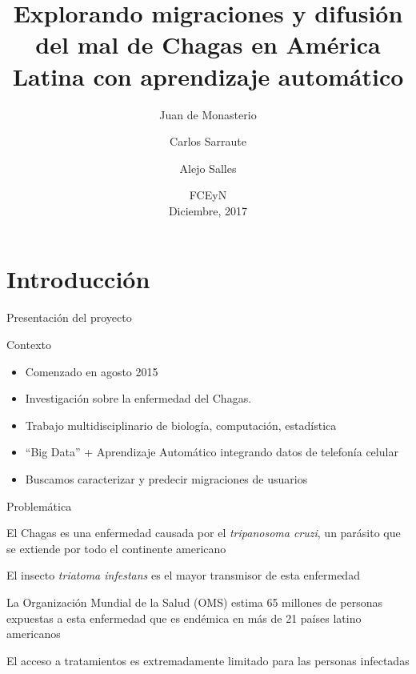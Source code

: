 \documentclass[xcolor=x11names]{beamer}
\title[Chagas \& Big Data]{Explorando migraciones y difusi\'on del mal de Chagas en América Latina con aprendizaje automático}
\author[Sarraute,Salles,de Monasterio]{Juan de Monasterio\inst{1}
  \and Carlos Sarraute\inst{3}
  \and Alejo Salles\inst{1}
  }
\institute[]{
  \and \inst{1} Universidad de Buenos Aires
  \and \inst{3} GranData Labs

  }
\date{ FCEyN \\ Diciembre, 2017}
\begin{document}


\section{Introducción}

\begin{frame}{Presentación  del proyecto}

	\begin{block}{Contexto}
		\begin{itemize}
			\item Comenzado en agosto 2015
			\item Investigación sobre la enfermedad del Chagas.
			\item Trabajo multidisciplinario de biología, computación, estadística
			\item ``Big Data'' + Aprendizaje Automático integrando datos de telefonía celular
			\item Buscamos caracterizar y predecir migraciones de usuarios
		\end{itemize}
	\end{block}


\end{frame}



\begin{frame}{Problemática}

			El Chagas es una enfermedad causada por el \textit{tripanosoma cruzi}, un parásito que se extiende por todo el continente americano

			\medskip  El insecto \textit{triatoma infestans} es el mayor transmisor de esta enfermedad

			\medskip  La Organización Mundial de la Salud (OMS) estima 65 millones de personas expuestas a esta enfermedad que es endémica en más de 21 países latino americanos

			\medskip El acceso a tratamientos es extremadamente limitado para las personas infectadas

\end{frame}
\end{document}
